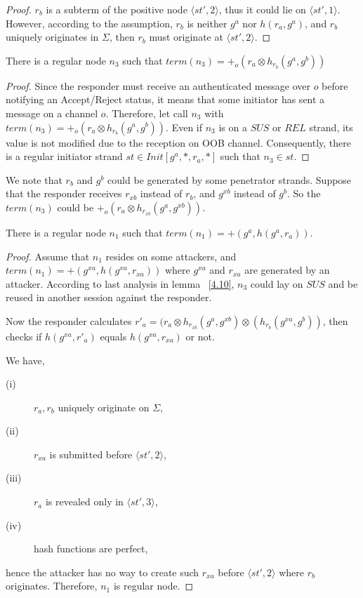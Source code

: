 \begin{proof}
$r_b$ is a subterm of the positive node $\langle st',2 \rangle$, thus it could lie on $\langle st',1 \rangle$. However, according to the assumption, $r_b$ is neither $g^a$ nor $h(r_a,g^a)$, and $r_b$ uniquely originates in $\Sigma$, then $r_b$ must originate at $\langle st',2 \rangle$.
\end{proof}
 
\begin{Lemma}\label{4.10}
There is a regular node $n_3$ such that $term(n_3)= +_o(r_a \otimes h_{r_b}(g^a,g^b))$ 
\end{Lemma}

\begin{proof}
Since the responder must receive an authenticated message over $o$ before notifying an Accept/Reject status, it means that some initiator has sent a message on a channel $o$. Therefore, let call $n_3$ with $term(n_3)= +_o(r_a \otimes h_{r_b}(g^a,g^b))$. Even if $n_3$ is on a $SUS$ or $REL$ strand, its value is not modified due to the reception on OOB channel. Consequently, there is a regular initiator strand $st \in Init[g^a,*, r_a,*]$ such that $n_3 \in st$. 
\end{proof}

We note that $r_b$ and $g^b$ could be generated by some penetrator strands. Suppose that the responder receives $r_{xb}$ instead of $r_b$, and $g^{xb}$ instead of $g^b$. So the $term(n_3)$ could be $+_o(r_a \otimes h_{r_{xb}}(g^a,g^{xb}))$.

\begin{Lemma}\label{4.11}
There is a regular node $n_1$ such that $term(n_1)= +(g^a,h(g^a,r_a))$.
\end{Lemma}

\begin{proof}
Assume that $n_1$ resides on some attackers, and $term(n_1) = +(g^{xa},h(g^{xa},r_{xa}))$ where $g^{xa}$ and $r_{xa}$ are generated by an attacker. According to last analysis in lemma ~\ref{4.10}, $n_3$ could lay on $SUS$ and be reused in another session against the responder. 

Now the responder calculates $r'_{a} = (r_a \otimes h_{r_{xb}}(g^a,g^{xb}) \otimes (h_{r_b}(g^{xa},g^b))$, then checks if $h(g^{xa},r'_{a})$ equals $h(g^{xa},r_{xa})$ or not. 

We have,
\begin{description} 
 \item [(i)] $r_a, r_b$ uniquely originate on $\Sigma$, 
 \item [(ii)] $r_{xa}$ is submitted before $\langle st',2\rangle$, 
 \item [(iii)] $r_{a}$ is revealed only in $\langle st',3 \rangle$, 
 \item [(iv)] hash functions are perfect, 
\end{description}
hence the attacker has no way to create such $r_{xa}$ before $\langle st',2 \rangle$ where $r_b$ originates. Therefore, $n_1$ is regular node. 
 \end{proof}

